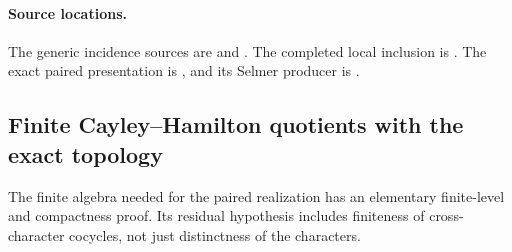 \paragraph{Source locations.}
The generic incidence sources are
\href{https://github.com/ChristianKudeba/alpoge-rh-verification/blob/alpoge-source-7cbf7a0c/src/Development/AutomorphicArithmetic/AutomorphicVarieties/CommutativeAlgebraHeight/GDetrad.lean}
{} and
\href{https://github.com/ChristianKudeba/alpoge-rh-verification/blob/alpoge-source-7cbf7a0c/src/Development/AutomorphicArithmetic/AutomorphicVarieties/CommutativeAlgebraHeight/GDetps.lean}
{}.
The completed local inclusion is
\href{https://github.com/ChristianKudeba/alpoge-rh-verification/blob/alpoge-source-7cbf7a0c/src/Development/AutomorphicArithmetic/AutomorphicVarieties/PatchingModules/AutomorphicDetection/GalOut.lean}
{}.
The exact paired presentation is
\href{https://github.com/ChristianKudeba/alpoge-rh-verification/blob/alpoge-source-7cbf7a0c/src/Development/AutomorphicArithmetic/AutomorphicVarieties/PatchingModules/SelmerScaling/CotangentIndependentOfResidues.lean}
{},
and its Selmer producer is
\href{https://github.com/ChristianKudeba/alpoge-rh-verification/blob/alpoge-source-7cbf7a0c/src/Development/AutomorphicArithmetic/AutomorphicVarieties/PatchingModules/SelmerScaling/AlCSmul.lean}
{}.

\subsection{Finite Cayley--Hamilton quotients with the exact topology}
\label{sec:sr-finite-CH}
The finite algebra needed for the paired realization has an elementary
finite-level and compactness proof. Its residual hypothesis includes
finiteness of cross-character cocycles, not just distinctness of the
characters.

